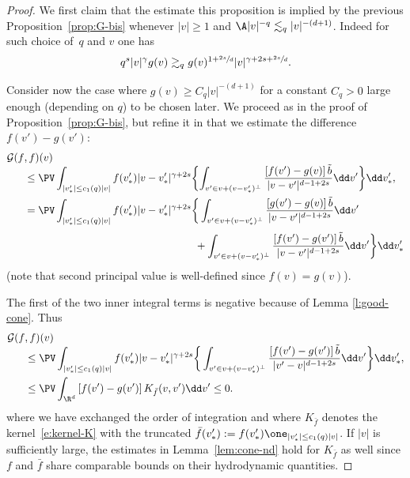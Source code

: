 \begin{proof}
We first claim that the estimate this proposition is implied by the
previous Proposition~\ref{prop:G-bis} whenever $|v| \ge 1$ and
$\A |v|^{-q} \lesssim_q |v|^{-(d+1)}$. Indeed for such choice of~$q$ and $v$ one has\vspace*{-3pt}
\[
q^s |v|^\gamma g(v) \gtrsim_q g(v)^{1+\sfrac{2s}d}
|v|^{\gamma+2s+\sfrac{2s}d}.
\]

Consider now the case where $g(v) \ge C_q |v|^{-(d+1)}$ for a
constant $C_q>0$ large enough (depending on $q$) to be chosen
later. We proceed as in the proof of Proposition~\ref{prop:G-bis},
but refine it in that we estimate the difference $f(v') - g(v')$:\vspace*{-3pt}
\begin{align*}
\mathcal G(f&,f)(v) \\[-4pt]
&\le \PV \int_{|v'_*| \le c_1(q) |v|} f(v'_*) |v-v'_*|^{\gamma+2s}
\biggl\{ \int_{v' \in v + (v-v'_*)^\bot} \frac{\left[f(v')-g(v)
\right] \tilde b}{|v-v'|^{d-1+2s}} \dd v' \biggr\} \dd
v'_*, \\
&= \PV \int_{|v'_*| \le c_1(q) |v|} f(v'_*) |v-v'_*|^{\gamma+2s} \bigg\{
\int_{v' \in v+ (v-v'_*)^\bot} \frac{\left[g(v')-g(v)\right]
\tilde b}{|v-v'|^{d-1+2s}} \dd v' \\[3pt]
& \hspace*{5.7cm} + \int_{v'
\in v+(v-v'_*)^\bot}
\frac{\left[f(v')-g(v')\right] \tilde b}{|v-v'|^{d-1+2s}} \dd v' \bigg\} \dd v'_*
\end{align*}
(note that second principal value is well-defined since $f(v)=g(v)$).

The first of the two inner integral terms is negative because of Lemma
\ref{l:good-cone}. Thus\vspace*{-3pt}
\begin{align*}
\mathcal G(f&,f)(v) \\[-4pt]
& \leq \PV \int_{|v'_*| \le c_1(q) |v|} f(v'_*) |v-v'_*|^{\gamma+2s}
\bigg\{ \int_{v' \in v+(v-v'_*)^\bot}
\frac{\left[f(v')-g(v')\right]\tilde b}{|v'-v|^{d-1+2s}} \dd
v'\bigg\} \dd v'_*,\\
&\le \PV \int_{\R^d} \left[f(v')-g(v')\right] K_{\bar f}(v,v') \dd
v' \le 0.
\end{align*}
where we have exchanged the order of integration and where
$K_{\bar f}$ denotes the \hbox{kernel}~\eqref{e:kernel-K} with the truncated
$\bar f(v'_*) := f(v'_*) \one_{|v'_*|\le c_1(q) |v|}$. If $|v|$ is
sufficiently large, the estimates in Lemma~\ref{lem:cone-nd} hold for
$K_{\bar f}$ as well since $f$ and $\bar f$ share comparable bounds on
their hydrodynamic quantities.


\end{proof}
